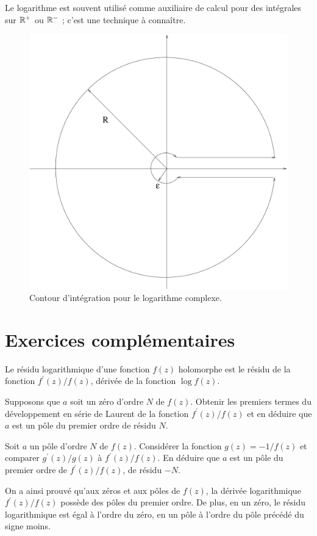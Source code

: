 Le logarithme est souvent utilisé comme auxiliaire de calcul pour des intégrales sur $\mathbb R^+$ ou $\mathbb R^-$ ; c'est une technique à connaître.
\begin{figure}
    \centering
    \includegraphics[scale=0.5]{images/contour_log.pdf}
    \caption{Contour d'intégration pour le logarithme complexe.}
    \label{fig:contour_log}
\end{figure}





\section{Exercices complémentaires}

\begin{exer}
Le résidu logarithmique d'une fonction $f(z)$ holomorphe est le résidu de la fonction $f^\prime(z)/f(z)$, dérivée de la fonction $\log f(z)$. 
\begin{MYenumerate}
\item Supposons que $a$ soit un zéro d'ordre $N$ de $f(z)$. Obtenir les premiers termes du développement en série de Laurent de la fonction $f^\prime(z)/f(z)$ et en déduire que $a$ est un pôle du premier ordre de résidu $N$.  
\item Soit $a$ un pôle d'ordre $N$ de $f(z)$. Considérer la fonction $g(z)=-1/f(z)$ et comparer $g^\prime(z)/g(z)$ à $f^\prime(z)/f(z)$. En déduire que $a$ est un pôle du premier ordre de $f^\prime(z)/f(z)$, de résidu $-N$.
\end{MYenumerate}
On a ainsi prouvé qu'aux zéros et aux pôles de $f(z)$, la dérivée logarithmique $f^\prime(z)/f(z)$ possède des pôles du premier ordre. De plus, en un zéro, le résidu logarithmique est égal à l'ordre du zéro, en un pôle à l'ordre du pôle précédé du signe moins.
\end{exer}

